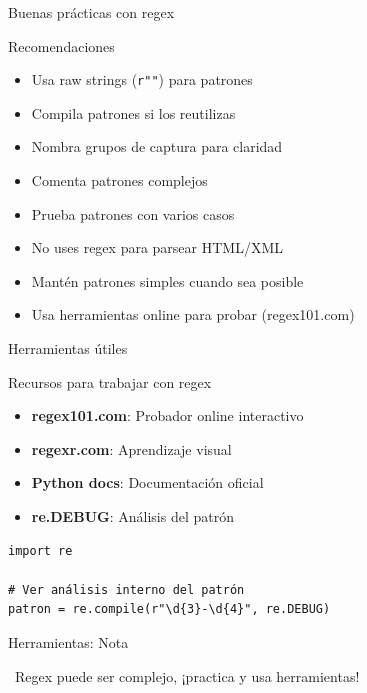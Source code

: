\documentclass{beamer}
\begin{document}
\begin{frame}{Buenas prácticas con regex \faCheckDouble}
\begin{conceptbox}{Recomendaciones}
\small
\begin{itemize}
    \item[\faCheck] Usa raw strings (\texttt{r""}) para patrones
    \item[\faCheck] Compila patrones si los reutilizas
    \item[\faCheck] Nombra grupos de captura para claridad
    \item[\faCheck] Comenta patrones complejos
    \item[\faCheck] Prueba patrones con varios casos
    \item[\faCheck] No uses regex para parsear HTML/XML
    \item[\faCheck] Mantén patrones simples cuando sea posible
    \item[\faCheck] Usa herramientas online para probar (regex101.com)
\end{itemize}
\end{conceptbox}
\end{frame}

\begin{frame}[fragile]{Herramientas útiles \faTools}
\begin{conceptbox}{Recursos para trabajar con regex}
\small
\begin{itemize}
    \item[\faGlobe] \textbf{regex101.com}: Probador online interactivo
    \item[\faGlobe] \textbf{regexr.com}: Aprendizaje visual
    \item[\faBook] \textbf{Python docs}: Documentación oficial
    \item[\faTerminal] \textbf{re.DEBUG}: Análisis del patrón
\end{itemize}
\end{conceptbox}

\begin{lstlisting}
import re

# Ver análisis interno del patrón
patron = re.compile(r"\d{3}-\d{4}", re.DEBUG)
\end{lstlisting}
\end{frame}

\begin{frame}{Herramientas: Nota \faLightbulb}
\begin{notebox}
\small\faLightbulb\ Regex puede ser complejo, ¡practica y usa herramientas!
\end{notebox}
\end{frame}
\end{document}
